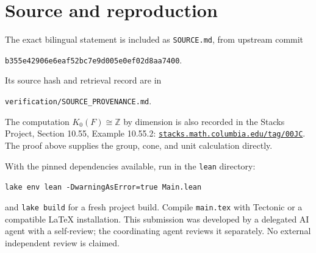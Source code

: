 \documentclass[11pt]{article}
\begin{document}
\section*{Source and reproduction}
The exact bilingual statement is included as \texttt{SOURCE.md}, from
upstream commit
\begin{center}\texttt{b355e42906e6eaf52bc7e9d005e0ef02d8aa7400}.\end{center}
Its source hash and retrieval record are in
\begin{center}\texttt{verification/SOURCE\_PROVENANCE.md}.\end{center}
The computation $K_0(F)\cong\mathbb Z$ by dimension is also recorded in
the Stacks Project, Section 10.55, Example 10.55.2:
\href{https://stacks.math.columbia.edu/tag/00JC}{\texttt{stacks.math.columbia.edu/tag/00JC}}.
The proof above supplies the group, cone, and unit calculation directly.

With the pinned dependencies available, run in the \texttt{lean} directory:
\begin{center}\texttt{lake env lean -DwarningAsError=true Main.lean}\end{center}
and \texttt{lake build} for a fresh project build. Compile
\texttt{main.tex} with Tectonic or a compatible LaTeX installation.
This submission was developed by a delegated AI agent with a self-review;
the coordinating agent reviews it separately. No external independent
review is claimed.
\end{document}
